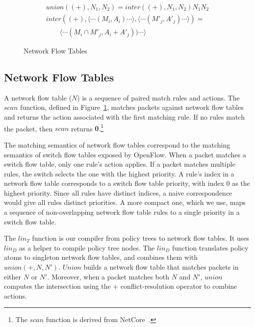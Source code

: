 \begin{figure}[t]
\begin{displaymath}
\begin{array}{l}
\mathit{union}((+),N_1,N_2) = \mathit{inter}((+),N_1,N_2) N_1 N_2 \\
\mathit{inter}((+),\langle\cdots(M_i,A_i)\cdots\rangle, \langle\cdots(M'_j,A'_j)\cdots\rangle) = \\
\qquad \langle\cdots(M_i \cap M'_j,A_i+A'_j))\cdots\rangle
\end{array}
\end{displaymath}

\caption{Network Flow Tables}
\label{f:intermediate}

\end{figure}

\subsection{Network Flow Tables}
\label{sec:nft}

A network flow table ($N$) is a sequence of paired match rules
and actions. The $\mathit{scan}$ function, defined in
Figure~\ref{f:intermediate}, matches packets against network flow
tables and returns the action associated with the first matching rule. If
no rules match the packet, then $\mathit{scan}$ returns $\textbf{0}$.\footnote{The
  $\mathit{scan}$ function is derived from 
  NetCore~\cite{Monsanto:2012}.}

The matching semantics of network flow tables correspond to the
matching semantics of switch flow tables exposed by OpenFlow.  When a
packet matches a switch flow table, only one rule's action applies. If a
packet matches multiple rules, the switch selects the one with the
highest priority.  A rule's index in a network flow table corresponds
to a switch flow table priority, with index $0$ as the highest
priority. Since all rules have distinct indices, a naive
correspondence would give all rules distinct priorities. A more
compact one, which we use, maps a sequence of
non-overlapping network flow table rules to a single priority in a
switch flow table.

The $\mathit{lin}_T$ function is our compiler from policy trees to
network flow tables. It uses $\mathit{lin}_D$ as a helper to compile
policy tree nodes.  The $\mathit{lin}_D$ function translates policy
atoms to singleton network flow tables, and combines them with
$\mathit{union(+,N,N')}$.  $\mathit{Union}$ builds a network flow table that
matches packets in either $N$ or $N'$. Moreover, when a packet
matches both $N$ and $N'$, $\mathit{union}$ computes the intersection
using the $+$ conflict-resolution operator to combine
actions.

